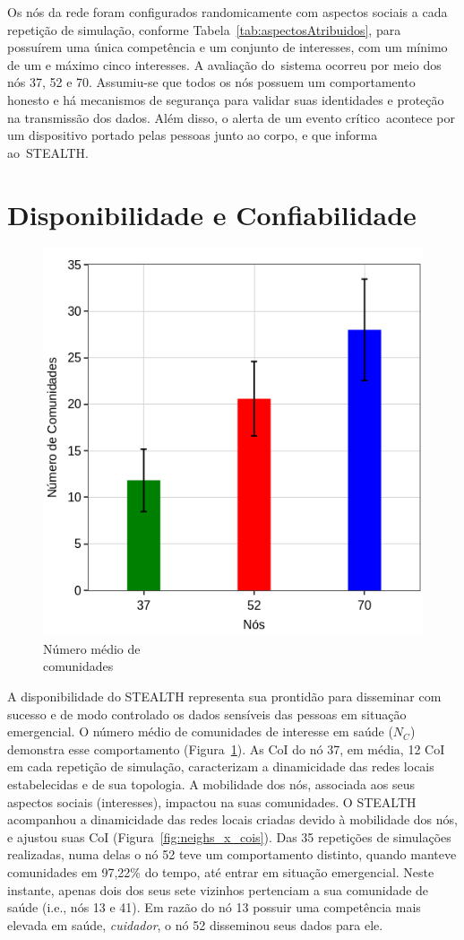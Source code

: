 \documentclass[12pt]{article}
\newcommand{\agn}[1]{\textcolor{auburn}{#1}}
\begin{document}
Os nós da rede foram configurados randomicamente com aspectos sociais a cada repetição de simulação, conforme Tabela~\ref{tab:aspectosAtribuidos},
para possuírem
uma única competência e um conjunto de interesses, com um mínimo de um e máximo cinco interesses. A avaliação do~sistema ocorreu 
por meio dos nós 37, 52 e 70.
Assumiu-se que todos os nós possuem um comportamento honesto e há mecanismos de segurança para validar suas identidades e proteção na transmissão dos dados. Além disso, 
o alerta de um evento crítico~acontece por 
um dispositivo portado pelas pessoas junto ao 
corpo, e que informa ao~\mbox{STEALTH}.



\section{Disponibilidade e Confiabilidade} \label{sec:results}

\begin{figure}
\centering
\includegraphics[width=.35\textwidth]{figures/coi_mean_performance_3_SBSEG19_v2.png}
\vspace{-0.5cm}
\caption[Número médio de comunidades]
{Número médio de \\ comunidades\endtabular}
\label{fig:coiEstabelecidas}
\end{figure}    

A disponibilidade do \mbox{STEALTH} representa sua prontidão para disseminar com sucesso e de modo controlado os dados sensíveis das pessoas em situação emergencial. O número médio de comunidades de interesse em saúde ($N_{C}$) demonstra esse comportamento (Figura~\ref{fig:coiEstabelecidas}).
As CoI do  nó 37, em média, 12 CoI em cada repetição de simulação,
caracterizam a dinamicidade das redes locais estabelecidas e de sua topologia. A mobilidade dos nós, associada aos seus aspectos sociais (interesses), impactou na suas comunidades. O \mbox{STEALTH} acompanhou a dinamicidade das redes locais criadas devido à mobilidade dos nós,
e ajustou suas CoI (Figura~\ref{fig:neighs_x_cois}).
Das 35 repetições de simulações realizadas, numa delas o nó 52
teve um comportamento distinto, quando 
manteve comunidades em 97,22\% do tempo, até entrar em situação emergencial. Neste instante, apenas dois dos seus sete vizinhos pertenciam a sua comunidade de saúde 
(i.e., nós 13 e 41). Em razão do nó 13 possuir uma competência mais elevada em saúde, \textit{cuidador}, o nó 52 disseminou seus dados para ele.
\end{document}
